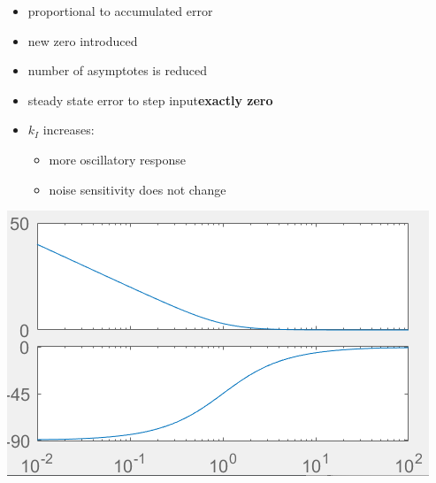         \begin{minipage}{0.49\linewidth}
            \begin{itemize}
                \item proportional to accumulated error
                \item new zero introduced
                \item number of asymptotes is reduced
                \item steady state error to step input\textbf{exactly zero}
                \item $k_I$ increases:
                \begin{itemize}
                    \item more oscillatory response
                    \item noise sensitivity does not change
                \end{itemize}
            \end{itemize}
        \end{minipage}
        \begin{minipage}{0.49\linewidth}
            \includegraphics[width = \linewidth]{src/images/PI-controller.png}
        \end{minipage}

